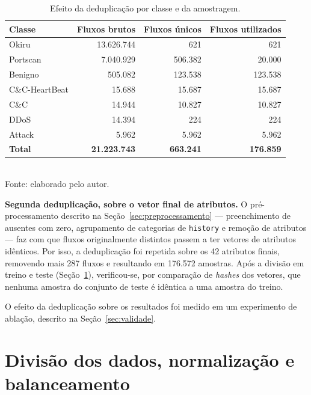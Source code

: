 \begin{table}[htbp]
\centering
\caption{Efeito da deduplicação por classe e da amostragem.}
\label{tab:dedup}
\begin{tabular}{lrrr}
\toprule
\textbf{Classe} & \textbf{Fluxos brutos} & \textbf{Fluxos únicos} & \textbf{Fluxos utilizados} \\
\midrule
Okiru            & 13.626.744 &     621 &     621 \\
Portscan         &  7.040.929 & 506.382 &  20.000 \\
Benigno          &    505.082 & 123.538 & 123.538 \\
C\&C-HeartBeat   &     15.688 &  15.687 &  15.687 \\
C\&C             &     14.944 &  10.827 &  10.827 \\
DDoS             &     14.394 &     224 &     224 \\
Attack           &      5.962 &   5.962 &   5.962 \\
\midrule
\textbf{Total}   & \textbf{21.223.743} & \textbf{663.241} & \textbf{176.859} \\
\bottomrule
\end{tabular}
\\[2pt]
\small{Fonte: elaborado pelo autor.}
\end{table}

\textbf{Segunda deduplicação, sobre o vetor final de atributos.} O pré-processamento descrito na Seção~\ref{sec:preprocessamento} --- preenchimento de ausentes com zero, agrupamento de categorias de \texttt{history} e remoção de atributos --- faz com que fluxos originalmente distintos passem a ter vetores de atributos idênticos. Por isso, a deduplicação foi repetida sobre os 42 atributos finais, removendo mais 287 fluxos e resultando em 176.572 amostras. Após a divisão em treino e teste (Seção~\ref{sec:divisao}), verificou-se, por comparação de \textit{hashes} dos vetores, que nenhuma amostra do conjunto de teste é idêntica a uma amostra do treino.

O efeito da deduplicação sobre os resultados foi medido em um experimento de ablação, descrito na Seção~\ref{sec:validade}.

\section{Divisão dos dados, normalização e balanceamento}
\label{sec:divisao}

